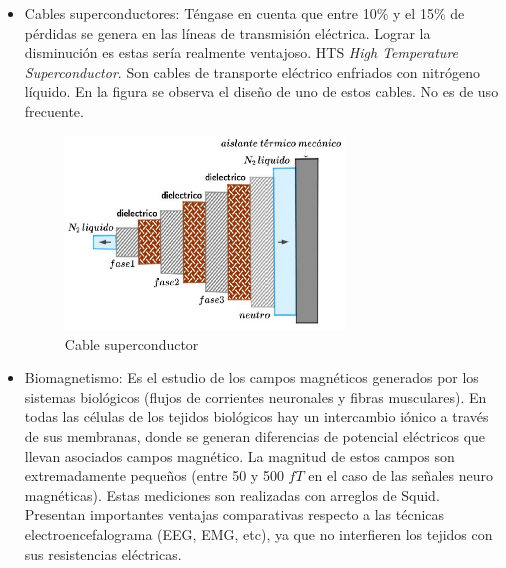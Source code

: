 \begin{itemize}
	\item Cables superconductores: Téngase en cuenta que entre 10\% y el 15\% de pérdidas se genera en las líneas de transmisión eléctrica. Lograr la disminución es estas sería realmente ventajoso. HTS \textit{High Temperature Superconductor}.
Son cables de transporte eléctrico enfriados con nitrógeno líquido. En la figura se observa el diseño de uno de estos cables. No es de uso frecuente.

\begin{figure}[H]
    \centering
    \includegraphics[width=0.7\textwidth]{./Figures/fig445}
	\caption{Cable superconductor}
	\label{fig:445}
\end{figure}


	\item Biomagnetismo: Es el estudio de los campos magnéticos generados por los sistemas biológicos (flujos de corrientes neuronales y fibras musculares). En todas las células de los tejidos biológicos hay un intercambio iónico a través de sus membranas, donde se generan diferencias de potencial eléctricos que llevan asociados campos magnético. La magnitud de estos campos son extremadamente pequeños (entre 50 y 500 $fT$ en el caso de las señales neuro magnéticas). Estas mediciones son realizadas con arreglos de Squid. Presentan importantes ventajas comparativas respecto a las técnicas electroencefalograma (EEG, EMG, etc), ya que no interfieren los tejidos con sus resistencias eléctricas. 
	

\end{itemize}
